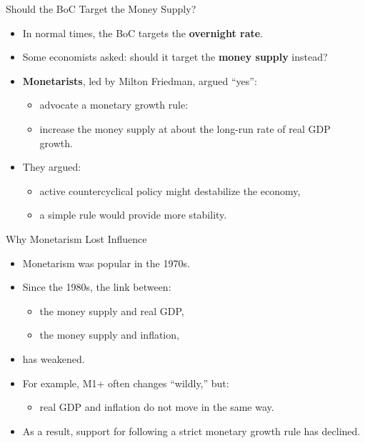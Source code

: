 \documentclass[aspectratio=169]{beamer}
\begin{document}
\begin{frame}{Should the BoC Target the Money Supply?}
\transfade
\begin{itemize}
  \item In normal times, the BoC targets the \textbf{overnight rate}.
  \item Some economists asked: should it target the \textbf{money supply} instead?
  \item \textbf{Monetarists}, led by Milton Friedman, argued “yes”:
  \begin{itemize}
    \item advocate a \alert{monetary growth rule}:
    \item increase the money supply at about the long-run rate of real GDP growth.
  \end{itemize}
  \item They argued:
  \begin{itemize}
    \item active countercyclical policy might destabilize the economy,
    \item a simple rule would provide more stability.
  \end{itemize}
\end{itemize}
\end{frame}

\begin{frame}{Why Monetarism Lost Influence}
\transfade
\begin{itemize}
  \item Monetarism was popular in the 1970s.
  \item Since the 1980s, the link between:
  \begin{itemize}
    \item the money supply and real GDP,
    \item the money supply and inflation,
  \end{itemize}
  \item has weakened.
  \item For example, M1+ often changes “wildly,” but:
  \begin{itemize}
    \item real GDP and inflation do not move in the same way.
  \end{itemize}
  \item As a result, support for following a strict monetary growth rule has declined.
\end{itemize}
\end{frame}
\end{document}
